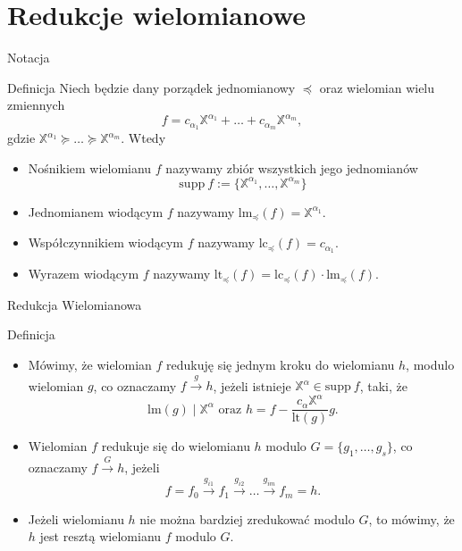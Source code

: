 \documentclass{beamer}
\newcommand{\supp}{\textrm{supp}}
\newcommand{\lc}{\textrm{lc}}
\newcommand{\lt}{\textrm{lt}}
\newcommand{\lm}{\textrm{lm}}
\begin{document}
\section{Redukcje wielomianowe}
\begin{frame}{Notacja}
    \begin{block}{Definicja}
        Niech będzie dany porządek jednomianowy $\preceq$ oraz wielomian wielu zmiennych 
        $$f = c_{\alpha_1}\mathbb{X}^{\alpha_1} + \ldots + c_{\alpha_m}\mathbb{X}^{\alpha_m},$$ gdzie
        $\mathbb{X}^{\alpha_1} \succeq \ldots \succeq \mathbb{X}^{\alpha_m}.$
        Wtedy 
        \begin{itemize}
            \item \alert{Nośnikiem} wielomianu $f$ nazywamy zbiór wszystkich jego jednomianów 
            $$ \supp \ f := \{\mathbb{X}^{\alpha_1}, \ldots, \mathbb{X}^{\alpha_m}\}$$
            \item \alert{Jednomianem wiodącym} $f$ nazywamy
            $\lm_{\preceq}(f)
            = \mathbb{X}^{\alpha_1}.$
            \item \alert{Współczynnikiem wiodącym} $f$ nazywamy $\lc_{\preceq}(f) = c_{\alpha_1}.$
            \item \alert{Wyrazem wiodącym} $f$ nazywamy $\lt_{\preceq}(f) = \lc_{\preceq}(f) \cdot \lm_{\preceq}(f).$
        \end{itemize}
    \end{block}
\end{frame}

\begin{frame}{Redukcja Wielomianowa}
    \begin{block}{Definicja}
        \begin{itemize}
        \item Mówimy, że wielomian $f$ redukuję się jednym kroku do wielomianu $h$,  modulo wielomian $g$, co oznaczamy $f \xrightarrow{g} h $, jeżeli istnieje $\mathbb{X}^{\alpha} \in \supp \ f$, taki, że 
        $$ \lm(g) \mid \mathbb{X}^{\alpha}  \text{  oraz  } h = f - \frac{c_{\alpha} \mathbb{X}^{\alpha} }{\lt (g)} g.$$

        \item Wielomian $f$ redukuje się do wielomianu $h$ modulo $G = \{g_1, \ldots , g_s\}$, co oznaczamy $f \xrightarrow{G} h$, jeżeli 
        $$ f = f_0 \xrightarrow{g_{i1}} f_1 \xrightarrow{g_{i2}}  \ldots  \xrightarrow{g_{im}} f_m =  h.$$
        
        \item Jeżeli wielomianu $h$ nie można bardziej zredukować modulo $G$, to mówimy, że $h$ jest \alert{resztą} wielomianu $f$ modulo $G$.
        \end{itemize}
    \end{block}
\end{frame}
\end{document}

